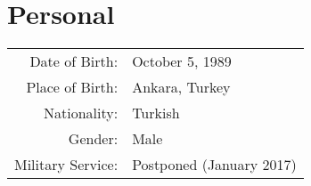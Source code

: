 \section{Personal} 
\sectionspacehalf

\begin{tabular}{rl}
Date of Birth: & October 5, 1989\\
Place of Birth: & Ankara, Turkey  \\
Nationality: & Turkish  \\
Gender: & Male \\
Military Service: & Postponed (January 2017) \\
\end{tabular}


\sectionspacehalf
